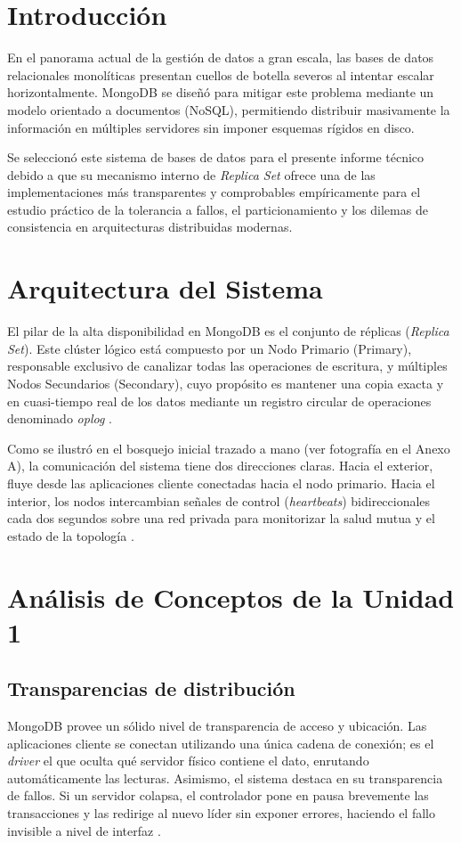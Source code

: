 \documentclass[12pt,a4paper]{article}
\begin{document}
\section{Introducción}
En el panorama actual de la gestión de datos a gran escala, las bases de datos relacionales monolíticas presentan cuellos de botella severos al intentar escalar horizontalmente. MongoDB se diseñó para mitigar este problema mediante un modelo orientado a documentos (NoSQL), permitiendo distribuir masivamente la información en múltiples servidores sin imponer esquemas rígidos en disco. 

Se seleccionó este sistema de bases de datos para el presente informe técnico debido a que su mecanismo interno de \textit{Replica Set} ofrece una de las implementaciones más transparentes y comprobables empíricamente para el estudio práctico de la tolerancia a fallos, el particionamiento y los dilemas de consistencia en arquitecturas distribuidas modernas.

\section{Arquitectura del Sistema}
El pilar de la alta disponibilidad en MongoDB es el conjunto de réplicas (\textit{Replica Set}). Este clúster lógico está compuesto por un Nodo Primario (Primary), responsable exclusivo de canalizar todas las operaciones de escritura, y múltiples Nodos Secundarios (Secondary), cuyo propósito es mantener una copia exacta y en cuasi-tiempo real de los datos mediante un registro circular de operaciones denominado \textit{oplog} \cite{schultz2025design}.

Como se ilustró en el bosquejo inicial trazado a mano (ver fotografía en el Anexo A), la comunicación del sistema tiene dos direcciones claras. Hacia el exterior, fluye desde las aplicaciones cliente conectadas hacia el nodo primario. Hacia el interior, los nodos intercambian señales de control (\textit{heartbeats}) bidireccionales cada dos segundos sobre una red privada para monitorizar la salud mutua y el estado de la topología \cite{mongodb2026replica}.

\section{Análisis de Conceptos de la Unidad 1}

\subsection{Transparencias de distribución}
MongoDB provee un sólido nivel de transparencia de acceso y ubicación. Las aplicaciones cliente se conectan utilizando una única cadena de conexión; es el \textit{driver} el que oculta qué servidor físico contiene el dato, enrutando automáticamente las lecturas. Asimismo, el sistema destaca en su transparencia de fallos. Si un servidor colapsa, el controlador pone en pausa brevemente las transacciones y las redirige al nuevo líder sin exponer errores, haciendo el fallo invisible a nivel de interfaz \cite{mongodb2026replica}.
\end{document}
